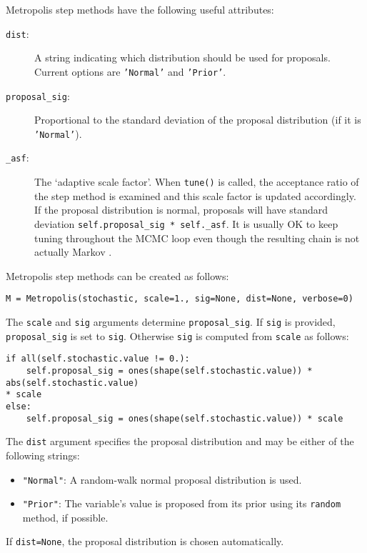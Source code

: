 Metropolis step methods have the following useful attributes:
\begin{description}
    \item[\texttt{dist}:] A string indicating which distribution should be used for proposals. Current options are \texttt{'Normal'} and \texttt{'Prior'}.
    \item[\texttt{proposal\_sig}:] Proportional to the standard deviation of the proposal distribution (if it is \texttt{'Normal'}).
    \item[\texttt{\_asf}:] The `adaptive scale factor'. When \texttt{tune()} is called, the acceptance ratio of the step method is examined and this scale factor is updated accordingly. If the proposal distribution is normal, proposals will have standard deviation \texttt{self.proposal\_sig * self.\_asf}. It is usually OK to keep tuning throughout the MCMC loop even though the resulting chain is not actually Markov \cite{tuning}. %
\end{description}

Metropolis step methods can be created as follows:
\begin{verbatim}
M = Metropolis(stochastic, scale=1., sig=None, dist=None, verbose=0)
\end{verbatim}
The \texttt{scale} and \texttt{sig} arguments determine \texttt{proposal\_sig}. If \texttt{sig} is provided, \texttt{proposal\_sig} is set to \texttt{sig}. Otherwise \texttt{sig} is computed from \texttt{scale} as follows:
\begin{verbatim}
if all(self.stochastic.value != 0.):
    self.proposal_sig = ones(shape(self.stochastic.value)) * abs(self.stochastic.value) 
* scale
else:
    self.proposal_sig = ones(shape(self.stochastic.value)) * scale
\end{verbatim}

The \texttt{dist} argument specifies the proposal distribution and may be either of the following strings:
\begin{itemize}
    \item \texttt{"Normal"}: A random-walk normal proposal distribution is used.
    \item \texttt{"Prior"}: The variable's value is proposed from its prior using its \texttt{random} method, if possible.
\end{itemize}
If \texttt{dist=None}, the proposal distribution is chosen automatically.

